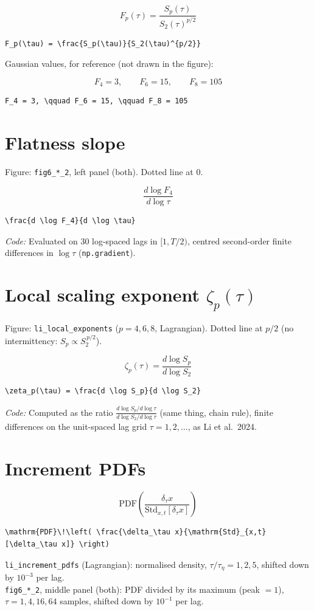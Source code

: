 \documentclass[11pt]{article}
\newcommand{\codenote}[1]{{\small\color{notegray}\emph{Code:} #1\par}}
\begin{document}
\[
F_p(\tau) = \frac{S_p(\tau)}{S_2(\tau)^{p/2}}
\]
\begin{lstlisting}
F_p(\tau) = \frac{S_p(\tau)}{S_2(\tau)^{p/2}}
\end{lstlisting}
Gaussian values, for reference (not drawn in the figure):

\[
F_4 = 3, \qquad F_6 = 15, \qquad F_8 = 105
\]
\begin{lstlisting}
F_4 = 3, \qquad F_6 = 15, \qquad F_8 = 105
\end{lstlisting}
\section{Flatness slope}
Figure: \texttt{fig6\_*\_2}, left panel (both). Dotted line at $0$.

\[
\frac{d \log F_4}{d \log \tau}
\]
\begin{lstlisting}
\frac{d \log F_4}{d \log \tau}
\end{lstlisting}
\codenote{Evaluated on 30 log-spaced lags in $[1, T/2)$, centred second-order finite differences in $\log\tau$ (\texttt{np.gradient}).}
\section{Local scaling exponent $\zeta_p(\tau)$}
Figure: \texttt{li\_local\_exponents} ($p = 4,6,8$, Lagrangian). Dotted line at $p/2$ (no intermittency: $S_p \propto S_2^{\,p/2}$).

\[
\zeta_p(\tau) = \frac{d \log S_p}{d \log S_2}
\]
\begin{lstlisting}
\zeta_p(\tau) = \frac{d \log S_p}{d \log S_2}
\end{lstlisting}
\codenote{Computed as the ratio $\frac{d \log S_p / d \log \tau}{d \log S_2 / d \log \tau}$ (same thing, chain rule), finite differences on the unit-spaced lag grid $\tau = 1, 2, \dots$, as Li et al.\ 2024.}
\section{Increment PDFs}
\[
\mathrm{PDF}\!\left( \frac{\delta_\tau x}{\mathrm{Std}_{x,t}[\delta_\tau x]} \right)
\]
\begin{lstlisting}
\mathrm{PDF}\!\left( \frac{\delta_\tau x}{\mathrm{Std}_{x,t}[\delta_\tau x]} \right)
\end{lstlisting}
\texttt{li\_increment\_pdfs} (Lagrangian): normalised density, $\tau/\tau_\eta = 1, 2, 5$, shifted down by $10^{-3}$ per lag.\\ \texttt{fig6\_*\_2}, middle panel (both): PDF divided by its maximum (peak $=1$), $\tau = 1, 4, 16, 64$ samples, shifted down by $10^{-1}$ per lag.
\end{document}
